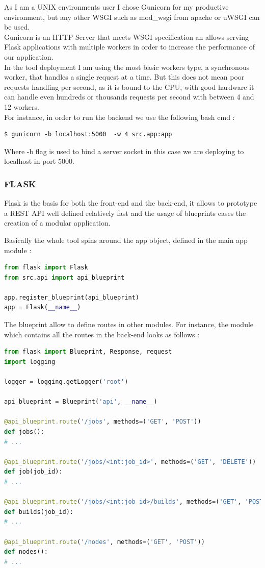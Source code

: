 \documentclass{article}
\begin{document}
As I am a UNIX environments user I chose Gunicorn for my productive environment, but any other WSGI such as mod\_wsgi from apache or uWSGI can be used. 
~\\

Gunicorn is an HTTP Server that meets WSGI specification an allows serving Flask applications with multiple workers in order to increase the performance of our application.
~\\

In the tool deployment I am using the most basic workers type, a synchronous worker, that handles a single request at a time. But this does not mean poor requests handling per second, as it is bound to the CPU, with good hardware it can handle even hundreds or thousands requests per second with between 4 and 12 workers.
~\\

For instance, in order to run the backend we use the following bash cmd :  

\begin{lstlisting}
$ gunicorn -b localhost:5000  -w 4 src.app:app 
\end{lstlisting}

Where -b flag is used to bind a server socket in this case we are deploying to localhost in port 5000.

\subsubsection{FLASK}

Flask is the basis for both the front-end and the back-end, it allows to prototype a REST API well defined relatively fast and the usage of blueprints eases the creation of a modular application.

Basically the whole tool spins around the app object, defined in the main app module :

\begin{lstlisting}[language=Python]
from flask import Flask
from src.api import api_blueprint

app.register_blueprint(api_blueprint)
app = Flask(__name__)
\end{lstlisting}

The blueprint allow to define routes in other modules. For instance, the module which contains all the routes in the back-end looks as follows : 

\begin{lstlisting}[language=Python]
from flask import Blueprint, Response, request
import logging

logger = logging.getLogger('root')

api_blueprint = Blueprint('api', __name__)

@api_blueprint.route('/jobs', methods=('GET', 'POST'))
def jobs():
# ...

@api_blueprint.route('/jobs/<int:job_id>', methods=('GET', 'DELETE'))
def job(job_id):
# ...

@api_blueprint.route('/jobs/<int:job_id>/builds', methods=('GET', 'POST'))
def builds(job_id):
# ...

@api_blueprint.route('/nodes', methods=('GET', 'POST'))
def nodes():
# ...
\end{lstlisting}
\end{document}
